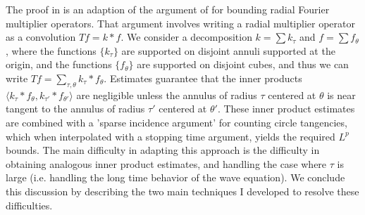 \documentclass[11pt]{article}
\DeclareMathOperator{\RR}{\mathbb{R}}
\begin{document}
The proof in \cite{DensonCharacterization} is an adaption of the argument of \cite{HeoNazarovSeeger} for bounding radial Fourier multiplier operators. That argument involves writing a radial multiplier operator as a convolution $Tf = k * f$. We consider a decomposition $k = \sum k_\tau$ and $f = \sum f_\theta$, where the functions $\{ k_\tau \}$ are supported on disjoint annuli supported at the origin, and the functions $\{ f_\theta \}$ are supported on disjoint cubes, and thus we can write $T f = \sum_{\tau,\theta} k_\tau * f_\theta$. Estimates guarantee that the inner products $\langle k_\tau * f_\theta, k_{\tau'} * f_{\theta'} \rangle$ are negligible unless the annulus of radius $\tau$ centered at $\theta$ is near tangent to the annulus of radius $\tau'$ centered at $\theta'$. These inner product estimates are combined with a 'sparse incidence argument' for counting circle tangencies, which when interpolated with a stopping time argument, yields the required $L^p$ bounds. The main difficulty in adapting this approach is the difficulty in obtaining analogous inner product estimates, and handling the case where $\tau$ is large (i.e. handling the long time behavior of the wave equation). We conclude this discussion by describing the two main techniques I developed to resolve these difficulties.


\end{document}
